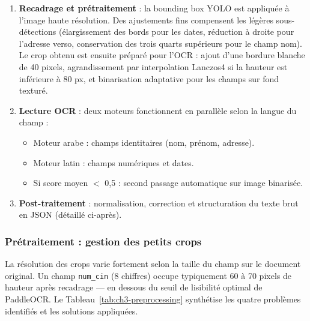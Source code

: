 \begin{enumerate}
  \item \textbf{Recadrage et prétraitement} : la bounding box YOLO est appliquée à l'image haute résolution. Des ajustements fins compensent les légères sous-détections (élargissement des bords pour les dates, réduction à droite pour l'adresse verso, conservation des trois quarts supérieurs pour le champ nom). Le crop obtenu est ensuite préparé pour l'OCR : ajout d'une bordure blanche de 40 pixels, agrandissement par interpolation Lanczos4 si la hauteur est inférieure à 80 px, et binarisation adaptative pour les champs sur fond texturé.

  \item \textbf{Lecture OCR} : deux moteurs fonctionnent en parallèle selon la langue du champ :
  \begin{itemize}
    \item Moteur arabe : champs identitaires (nom, prénom, adresse).
    \item Moteur latin : champs numériques et dates.
    \item Si score moyen $<$ 0,5 : second passage automatique sur image binarisée.
  \end{itemize}

  \item \textbf{Post-traitement} : normalisation, correction et structuration du texte brut en JSON (détaillé ci-après).
\end{enumerate}

\subsubsection{Prétraitement : gestion des petits crops}

La résolution des crops varie fortement selon la taille du champ sur le document original. Un champ \texttt{num\_cin} (8 chiffres) occupe typiquement 60 à 70 pixels de hauteur après recadrage — en dessous du seuil de lisibilité optimal de PaddleOCR. Le Tableau~\ref{tab:ch3-preprocessing} synthétise les quatre problèmes identifiés et les solutions appliquées.

